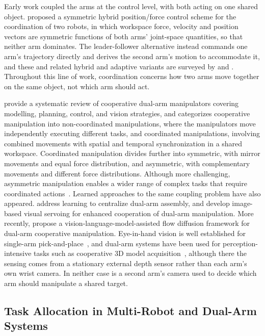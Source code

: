 Early work coupled the arms at the control level, with both acting on one shared object.
\citet{uchiyama1988symmetric} proposed a symmetric hybrid position/force control scheme for the
coordination of two robots, in which workspace force, velocity and position vectors are symmetric
functions of both arms' joint-space quantities, so that neither arm dominates. The leader-follower
alternative instead commands one arm's trajectory directly and derives the second arm's motion to
accommodate it, and these and related hybrid and adaptive variants are surveyed by
\citet{caccavale2025cooperative} and \citet{smith2012dual}. Throughout this line of work,
coordination concerns how two arms move together on the same object, not which arm should
act.

\citet{abbas2023systematic} provide a systematic review of cooperative dual-arm manipulators
covering modelling, planning, control, and vision strategies, and \citet{makris2021cooperative}
categorizes cooperative manipulation into non-coordinated manipulations, where the manipulators move
independently executing different tasks, and coordinated manipulations, involving combined movements
with spatial and temporal synchronization in a shared workspace. Coordinated manipulation divides
further into symmetric, with mirror movements and equal force distribution, and asymmetric, with
complementary movements and different force distributions. Although more challenging, asymmetric
manipulation enables a wider range of complex tasks that require coordinated
actions~\citep{surya2025iapf}. Learned approaches to the same coupling problem have also appeared. \citet{alles2022learning} address learning to centralize dual-arm assembly, and \citet{zhang2025imagebased} develop image-based visual servoing for enhanced cooperation of dual-arm manipulation. More recently, \citet{chen2026vlmsfd} propose a vision-language-model-assisted flow diffusion framework for dual-arm cooperative manipulation. Eye-in-hand vision is well established for single-arm pick-and-place~\citep{nguyen2025vision}, and dual-arm systems have been used for perception-intensive tasks such as cooperative 3D model acquisition~\citep{kobayashi2022obtaining}, although there the sensing comes from a stationary external depth sensor rather than each arm's own wrist camera. In neither case is a second arm's camera used to decide which arm should manipulate a shared target.

\subsection{Task Allocation in Multi-Robot and Dual-Arm Systems}\label{subsec:lit_allocation}

